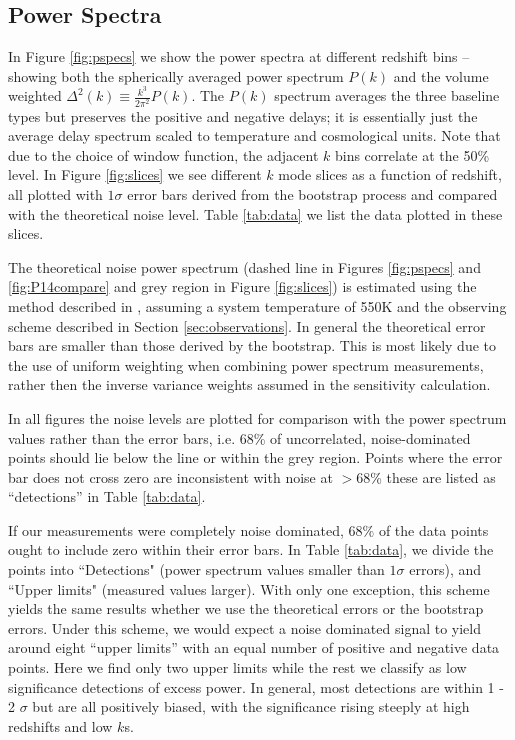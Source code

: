 \documentclass[preprint2]{aastex}
\begin{document}
\subsection{Power Spectra}
\label{sec:pspecs}

In  Figure \ref{fig:pspecs} we show the  power spectra at different redshift bins --showing both the spherically averaged power spectrum $P(k)$ and the volume weighted  $\Delta^2(k)\equiv\frac{k^3}{2\pi^2}P(k)$.  The $P(k)$ spectrum averages the three baseline types but preserves the positive and negative delays; it is essentially just the average delay spectrum scaled to temperature and cosmological units. Note that due to the choice of window function, the adjacent $k$ bins correlate at the  50\% level. In Figure \ref{fig:slices} we see different $k$ mode slices as a function of redshift,  all plotted with $1\sigma$ error bars derived from the bootstrap process and compared with the theoretical noise level. Table \ref{tab:data} we list the data plotted in these slices.   

The theoretical noise power spectrum (dashed line in Figures \ref{fig:pspecs} and \ref{fig:P14compare} and grey region in Figure \ref{fig:slices}) is estimated using the method described in \cite{Pober:2013p9581}, assuming a system temperature of 550K and the observing scheme described in Section \ref{sec:observations}. In general the theoretical error bars are smaller than those derived by the bootstrap.  This is most likely due to the use of uniform weighting when combining power spectrum measurements, rather then the inverse variance weights assumed in the sensitivity calculation.

 In all figures the noise levels are plotted for comparison with the power spectrum values rather than the error bars, i.e. 68\% of uncorrelated, noise-dominated points should lie below the line or within the grey region.    Points where the error bar does not cross zero are inconsistent with noise at $>68$\% these are listed as ``detections'' in Table \ref{tab:data}.   

If our measurements were completely noise dominated, $68\%$ of the data points ought to include zero within their error bars.  In Table \ref{tab:data}, we divide the points into ``Detections" (power spectrum values smaller than $1\sigma$ errors), and ``Upper limits" (measured values larger).  With only one exception, this scheme yields the same results whether we use the theoretical errors or the bootstrap errors.  Under this scheme, we would expect a noise dominated signal to yield around eight ``upper limits'' with an equal number of positive and negative data points. Here we find only two upper limits while the rest we classify as low significance detections of excess power. In general, most detections are within 1 - 2 $\sigma$ but are all positively biased,  with the significance rising steeply at high redshifts and low $k$s.%
\end{document}
